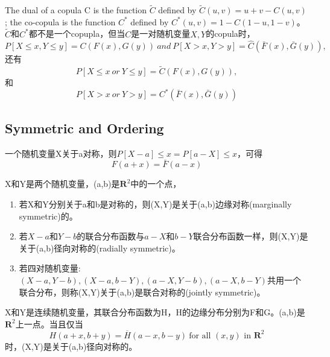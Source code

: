 The \textcolor[rgb]{1,0,0}{dual of a copula C} is the function $\tilde{C}$ defined by $\tilde{C}(u,v) = u+v-C(u,v)$; the \textcolor[rgb]{1,0,0}{co-copula} is the function $C^*$ defined by $C^*(u,v) = 1-C(1-u,1-v)$。$\tilde{C}$和$C^*$都不是一个copupla，但当$C$是一对随机变量$X,Y$的copula时，
\begin{equation*}
    P[X \leq x, Y\leq y] = C(F(x),G(y)) \ and \ P[X>x,Y>y] = \hat{C}(\bar{F}(x),\bar{G}(y)),
\end{equation*}
还有
\begin{equation}
    P[X\leq x \ or\ Y\leq y] = \tilde{C}(F(x),G(y)),
    \label{eq-dual}
\end{equation}
和
\begin{equation}
    P[X>x \ or \ Y>y] = C^*(\bar{F}(x),\bar{G}(y))
    \label{eq-cocopula}
\end{equation}



\subsection{Symmetric and Ordering}
一个随机变量X关于a对称，则$P[X-a]\leq x = P[a-X]\leq x$，可得
\begin{equation}
    F(a+x) = \bar{F}(a-x)
    \label{eq-symmetricF}
\end{equation}

\begin{definition}
    X和Y是两个随机变量，(a,b)是$\mathbf{R}^2$中的一个点，
    \begin{enumerate}
        \item 若X和Y分别关于a和b是对称的，则(X,Y)是关于(a,b)边缘对称(marginally symmetric)的。
        \item 若$X-a$和$Y-b$的联合分布函数与$a-X$和$b-Y$联合分布函数一样，则(X,Y)是关于(a,b)径向对称的(radially symmetric)。
        \item 若四对随机变量:$(X-a,Y-b),(X-a,b-Y),(a-X,Y-b),(a-X,b-Y)$共用一个联合分布，则称(X,Y)关于(a,b)是联合对称的(jointly symmetric)。
    \end{enumerate}
    \label{def-symmetric}
\end{definition}

\begin{theorem}
    X和Y是连续随机变量，其联合分布函数为H，H的边缘分布分别为F和G。(a,b)是$\mathbf{R}^2$上一点。当且仅当
    \begin{equation}
        H(a+x,b+y) = \overline{H}(a-x,b-y)\ \text{for all $(x,y)$ in $\mathbf{R}^2$}
        \label{eq-radiallysymmetric}
    \end{equation}
    时，(X,Y)是关于(a,b)径向对称的。
    \label{thr-radiallysymmetric}
\end{theorem}

